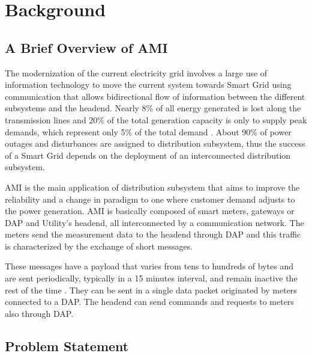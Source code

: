 \documentclass[conference]{IEEEtran}
\begin{document}

\section{Background}

\subsection{A Brief Overview of AMI}


The modernization of the current electricity grid involves a large use of information technology to move the current system towards Smart Grid using communication that allows bidirectional flow of information between the different subsystems and the headend. Nearly 8\% of all energy generated is lost along the transmission lines and 20\% of the total generation capacity is only to supply peak demands, which represent only 5\% of the total demand \cite{Farhangi2010}. About 90\% of power outages and disturbances are assigned to distribution subsystem, thus the success of a Smart Grid depends on the deployment of an interconnected distribution subsystem. 

AMI is the main application of distribution subsystem that aims to improve the reliability and  a change in paradigm  to one where customer demand adjusts to the power generation. AMI is basically composed of smart meters, gateways or DAP and  Utility's headend, all interconnected by a communication network. The meters send the measurement data to the headend through DAP and this traffic is characterized by the exchange of short messages.  

These messages have a payload that varies from tens to hundreds of bytes and are sent periodically, typically in a 15 minutes interval, and remain inactive the rest of the time \cite{SRS:13,4547164}. They can be sent in a single data packet originated by meters connected to a DAP. The headend can send commands and requests to meters also through DAP.


\subsection{Problem Statement}
\end{document}
